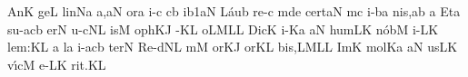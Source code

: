 \Internote
\nosolesmescustos
\initiumgregorianum
{}%
\sgn {}An\punctum K\egn
\sgn ge{}\punctum L\egn
\spatium
\sgn lin\pes Na\egn
{}a{,}\clivis aN\egn
\spatium
{}or\punctum a\egn
\sgn {}i-\ngl{}\punctum c\egn
{}\clivis cb\egn
\sgn {}i{}\episem b1\clivis aN\egn
\spatium
\divisiominima
\spatium
\sgn L{\'a}u\punctum b\egn
\sgn re-\punctum c\egn
{}m\pes de\egn
\spatium
\sgn ce{rt}\clivis aN\egn
{}m\punctum c\egn
\sgn {}i-\clivis ba\egn
\sgn ni{s,}\punctum a\augmentum b\egn
\spatium
\divisiomaior
\spatium
\custos a
\lineaproxima
\sgn {}Et\punctum a\egn
\spatium
\sgn su-\torculus acb\egn
{}er\punctum N\egn
\spatium
{}u{-c}\clivis NL\egn
\sgn {}is\punctum M\egn
\spatium
{}o{ph}\clivis KJ\egn
\sgn {}{\'\ae}-\pes KL\egn
\sgn {}o{}\torculus LML\augmentum L\egn
\spatium
\divisiominima
\spatium
\sgn Dic\punctum K\egn
\spatium
{}i-\pes Ka\egn
{}\clivis aN\egn
\sgn hum\clivis LK\egn
\spatium
\sgn n{\'o}b\punctum M\egn
\sgn {}i-\clivis LK\egn
\sgn le{m:}\punctum K\augmentum L\egn
\spatium
\divisiomaior
\spatium
\custos a
\lineaproxima
{}l\punctum a\egn
\sgn {}i-\torculus acb\egn
\sgn ter\punctum N\egn
\spatium
\sgn Re{-d}\clivis NL\egn
{}m\punctum M\egn
{}or\clivis KJ\egn
\spatium
\sgn {}or\pes KL\egn
\sgn bi{s,}\torculus LML\augmentum L\egn
\spatium
\divisiominima
\spatium
\sgn {}Im\punctum K\egn
\sgn mol\pes Ka\egn
{}\clivis aN\egn
\sgn {}us\clivis LK\egn
\spatium
\sgn v{\'\i}c\punctum M\egn
\sgn {}e-\clivis LK\egn
\sgn ri{t.}\punctum K\augmentum L\egn
\spatium
\Finisgregoriana

\bigskip

\beginlyrics

